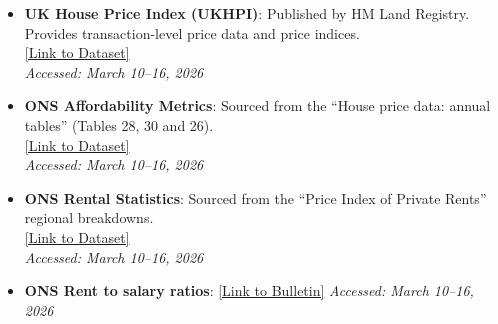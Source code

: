 \documentclass[11pt,a4paper]{article}
\begin{document}
\begin{itemize}
    \item \textbf{UK House Price Index (UKHPI)}: Published by HM Land Registry. Provides transaction-level price data and price indices. \\ 
    \href{https://landregistry.data.gov.uk/app/ukhpi/browse}{[Link to Dataset]} \\
    \textit{Accessed: March 10--16, 2026}

    \item \textbf{ONS Affordability Metrics}: Sourced from the ``House price data: annual tables'' (Tables 28, 30 and 26). \\ 
    \href{https://www.ons.gov.uk/economy/inflationandpriceindices/datasets/housepriceindexannualtables2039}{[Link to Dataset]} \\
    \textit{Accessed: March 10--16, 2026}

    \item \textbf{ONS Rental Statistics}: Sourced from the ``Price Index of Private Rents'' regional breakdowns. \\ 
    \href{https://www.ons.gov.uk/economy/inflationandpriceindices/bulletins/privaterentandhousepricesuk/february2026}{[Link to Dataset]} \\
    \textit{Accessed: March 10--16, 2026}

    \item \textbf{ONS Rent to salary ratios}: \href{https://www.ons.gov.uk/peoplepopulationandcommunity/housing/bulletins/privaterentalaffordabilityengland/2024}{[Link to Bulletin]}
    \textit{Accessed: March 10--16, 2026}
    

    
\end{itemize}
\end{document}

